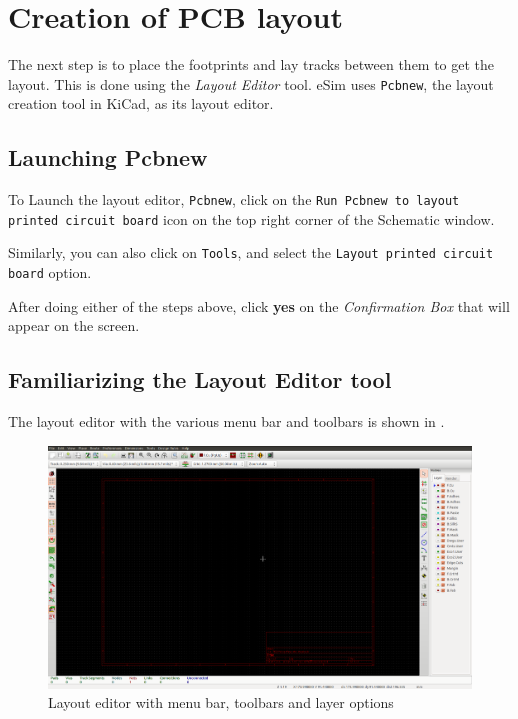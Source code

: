 \section{Creation of PCB layout}
 

The next step is to place the footprints and lay tracks between them
to get the layout. This is done using the \textit{Layout Editor}
tool. eSim uses {\tt Pcbnew}, the layout creation tool in KiCad, as
its layout editor.

\subsection{Launching Pcbnew}
\begin{compactenum}
\item To Launch the layout editor, \texttt{Pcbnew}, click on the \texttt{Run Pcbnew to layout printed circuit board} icon on the top right corner of the Schematic window.
\item Similarly, you can also click on \texttt{Tools}, and select the \texttt{Layout printed circuit board} option.
\item After doing either of the steps above, click \textbf{yes} on the \textit{Confirmation Box} that will appear on the screen.
\end{compactenum}

\subsection{Familiarizing the Layout Editor tool}

The layout editor with the various menu bar and toolbars is shown in
.
\begin{figure}
\centering
\includegraphics[width=0.68\linewidth]{NGHDL/toptble.png}
\caption{Layout editor with menu bar, toolbars and layer options}
\label{pcbnew}
\end{figure}


